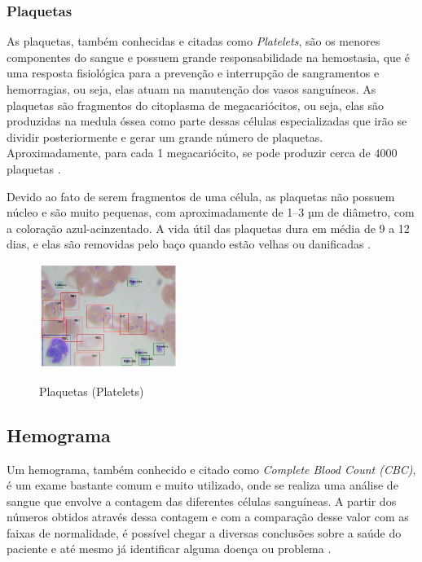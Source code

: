 \subsubsection{Plaquetas}
As plaquetas, também conhecidas e citadas como \emph{Platelets}, são os menores componentes do sangue e possuem grande responsabilidade na hemostasia, que é uma resposta fisiológica para a prevenção e interrupção de sangramentos e hemorragias, ou seja, elas atuam na manutenção dos vasos sanguíneos. As plaquetas são fragmentos do citoplasma de megacariócitos, ou seja, elas são produzidas na medula óssea como parte dessas células especializadas que irão se dividir posteriormente e gerar um grande número de plaquetas. Aproximadamente, para cada 1 megacariócito, se pode produzir cerca de 4000 plaquetas \cite{abcOfCbc}.

Devido ao fato de serem fragmentos de uma célula, as plaquetas não possuem núcleo e são muito pequenas, com aproximadamente de 1–3 µm de diâmetro, com a coloração azul-acinzentado. A vida útil das plaquetas dura em média de 9 a 12 dias, e elas são removidas pelo baço quando estão velhas ou danificadas \cite{abcOfCbc}.

\begin{figure}[!htb]
	\centering
	\caption{Plaquetas (Platelets)}
	\includegraphics[width=0.40\textwidth]{img/plt.jpg}
	\label{fig:plaquetas}
\end{figure}
 
\subsection{Hemograma}
Um hemograma, também conhecido e citado como \emph{Complete Blood Count (CBC)}, é um exame bastante comum e muito utilizado, onde se realiza uma análise de sangue que envolve a contagem das diferentes células sanguíneas. A partir dos números obtidos através dessa contagem e com a comparação desse valor com as faixas de normalidade, é possível chegar a diversas conclusões sobre a saúde do paciente e até mesmo já identificar alguma doença ou problema \cite{manualHematologia, abcOfCbc}.

